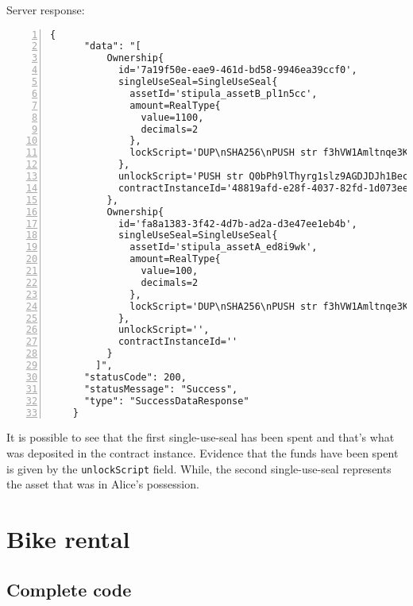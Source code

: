 Server response:
{
  \small
  \begin{Verbatim}[numbers=left,xleftmargin=1cm,firstnumber=1,breaklines=true,breakanywhere=true,tabsize=2]
    {
      "data": "[
          Ownership{
            id='7a19f50e-eae9-461d-bd58-9946ea39ccf0', 
            singleUseSeal=SingleUseSeal{
              assetId='stipula_assetB_pl1n5cc', 
              amount=RealType{
                value=1100, 
                decimals=2
              }, 
              lockScript='DUP\nSHA256\nPUSH str f3hVW1Amltnqe3KvOT00eT7AU23FAUKdgmCluZB+nss=\nEQUAL\nCHECKSIG\nHALT\n'
            }, 
            unlockScript='PUSH str Q0bPh9lThyrg1slz9AGDJDJh1BecN9SlGCeVe3BqLod+zO7q0wvIy8tLognHNBkR8e8zKo6nWGQ8qZ7egjOmm5BQsqZzt8xL3gBbR36vgk9J3G9ObiTR2Dd7hMqsqyJnLT3aZUPXGc6RZoM/iUFGJUXhq2T6DStvYNKuAH+Lfow=\nPUSH str MIGfMA0GCSqGSIb3DQEBAQUAA4GNADCBiQKBgQDErzzgD2ZslZxciFAiX3/ot7lrkZDw4148jFZrsDZPE6CVs9xXFSHGgy/mFvIFLXhnChO6Nyd2be3lbgeavLMCMVUiTStXr117Km17keWpb3sItkKKsLFBOcIIU8XXowI/OhzQN2XPZYESHgjdQ5vwEj2YyueiS7WKP94YWz/pswIDAQAB\n', 
            contractInstanceId='48819afd-e28f-4037-82fd-1d073ee1d318'
          }, 
          Ownership{
            id='fa8a1383-3f42-4d7b-ad2a-d3e47ee1eb4b', 
            singleUseSeal=SingleUseSeal{
              assetId='stipula_assetA_ed8i9wk', 
              amount=RealType{
                value=100, 
                decimals=2
              }, 
              lockScript='DUP\nSHA256\nPUSH str f3hVW1Amltnqe3KvOT00eT7AU23FAUKdgmCluZB+nss=\nEQUAL\nCHECKSIG\nHALT\n'
            }, 
            unlockScript='', 
            contractInstanceId=''
          }
        ]",
      "statusCode": 200,
      "statusMessage": "Success",
      "type": "SuccessDataResponse"
    }
  \end{Verbatim}
}

It is possible to see that the first single-use-seal has been spent and that's what was deposited in the 
contract instance. Evidence that the funds have been spent is given by the \verb|unlockScript| field. 
While, the second single-use-seal represents the asset that was in Alice's possession.

\section{Bike rental}

\subsection{Complete code}
\label{app:bike-rental-complete-code}

